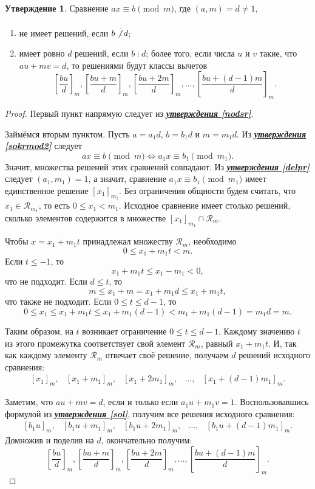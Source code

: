 \documentclass[14pt, a4paper]{extarticle}
\theoremstyle{definition}
\newtheorem{statement}{Утверждение}
\newcommand{\divisible}{\mathop{\vdots}}
\begin{document}
	\begin{statement}
		Сравнение $ax\equiv b\pmod{m}$, где $(a,m)=d\neq1$,
		\begin{enumerate}[topsep=0pt,itemsep=-1ex,partopsep=1ex,parsep=1ex]
			\item не имеет решений, если $b\not\divisible d$;
			\item имеет ровно $d$ решений, если $b\divisible d$; более того, если числа $u$ и $v$ такие, что $au+mv=d$, то решениями будут классы вычетов $$\left[\frac{bu}{d}\right]_m, \left[\frac{bu+m}{d}\right]_m, \left[\frac{bu+2m}{d}\right]_m, \dots, \left[\frac{bu+(d-1)m}{d}\right]_m.$$
		\end{enumerate}
	\end{statement}
	\begin{proof}
		Первый пункт напрямую следует из \hyperref[nodsr]{\textbf{\textit{утверждения \ref*{nodsr}}}}.
		
		Займёмся вторым пунктом. Пусть $a=a_1d$, $b=b_1d$ и $m=m_1d$. Из \hyperref[sokrmod2]{\textbf{\textit{утверждения \ref*{sokrmod2}}}} следует
		$$\boxed{ax\equiv b\pmod{m}\Leftrightarrow a_1x\equiv b_1\pmod{m_1}}.$$
		Значит, множества решений этих сравнений совпадают. Из \hyperref[delpr]{\textbf{\textit{утверждения \ref*{delpr}}}} следует $(a_1,m_1)=1$, а значит, сравнение $a_1x\equiv b_1\pmod{m_1}$ имеет единственное решение $[x_1]_{m_1}$. Без ограничения общности будем считать, что $x_1\in\mathcal{R}_{m_1}$, то есть $0\leqslant x_1<m_1$. Исходное сравнение имеет столько решений, сколько элементов содержится в множестве $[x_1]_{m_1}\cap\mathcal{R}_m$.
		
		Чтобы $x=x_1+m_1t$ принадлежал множеству $\mathcal{R}_m$, необходимо $$0\leqslant x_1+m_1t<m.$$ Если $t\leqslant-1$, то $$x_1+m_1t\leqslant x_1-m_1<0,$$ что не подходит. Если $d\leqslant t$, то $$m\leqslant x_1+m=x_1+m_1d\leqslant x_1+m_1t,$$ что также не подходит. Если $0\leqslant t\leqslant d-1$, то
		$$\boxed{0\leqslant}x_1\leqslant\boxed{x_1+m_1t}\leqslant x_1+m_1(d-1)\boxed{<}m_1+m_1(d-1)=m_1d=\boxed{m}.$$
		
		Таким образом, на $t$ возникает ограничение $0\leqslant t\leqslant d-1$. Каждому значению $t$ из этого промежутка соответствует свой элемент $\mathcal{R}_m$, равный $x_1+m_1t$. И, так как каждому элементу $\mathcal{R}_m$ отвечает своё решение, получаем $d$ решений исходного сравнения:
		$$\begin{array}{ccccc}
			[x_1]_m,&[x_1+m_1]_m,&[x_1+2m_1]_m,&\dots,&[x_1+(d-1)m_1]_m.
		\end{array}$$
		
		Заметим, что $au+mv=d$, если и только если \mbox{$a_1u+m_1v=1$}. Воспользовавшись формулой из \hyperref[sol]{\textbf{\textit{утверждения \ref*{sol}}}}, получим все решения исходного сравнения:
		$$\begin{array}{ccccc}
			[b_1u]_m,&[b_1u+m_1]_m,&[b_1u+2m_1]_m,&\dots,&[b_1u+(d-1)m_1]_m.
		\end{array}$$
		Домножив и поделив на $d$, окончательно получим:
		$$\left[\frac{bu}{d}\right]_m, \left[\frac{bu+m}{d}\right]_m, \left[\frac{bu+2m}{d}\right]_m, \dots, \left[\frac{bu+(d-1)m}{d}\right]_m.$$
	\end{proof}
\end{document}
